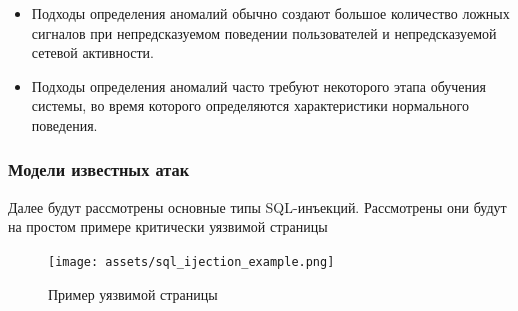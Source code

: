 \begin{itemize}
	\item Подходы определения аномалий обычно создают большое количество ложных сигналов 
	при непредсказуемом поведении пользователей и непредсказуемой сетевой активности.

	\item Подходы определения аномалий часто требуют некоторого этапа обучения системы, 
	во время которого определяются характеристики нормального поведения.
\end{itemize}



\subsubsection{Модели известных атак}

Далее будут рассмотрены основные типы SQL-инъекций. Рассмотрены они будут на простом примере критически уязвимой страницы
\begin{figure}[h]
    \centering
    \texttt{[image: assets/sql\_ijection\_example.png]}
    \caption{Пример уязвимой страницы}
    \label{fig:mesh1}
\end{figure}

